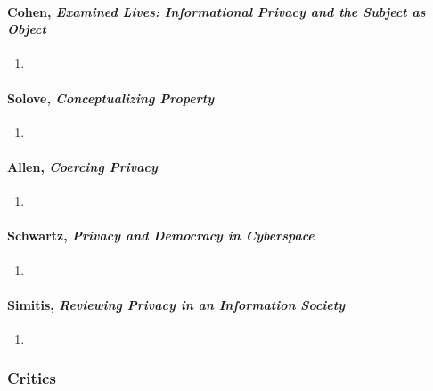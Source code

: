 \paragraph{Cohen, \emph{Examined Lives: Informational Privacy and the Subject 
as Object}}

\begin{enumerate}
    \item %
\end{enumerate}

\paragraph{Solove, \emph{Conceptualizing Property}}

\begin{enumerate}
    \item %
\end{enumerate}

\paragraph{Allen, \emph{Coercing Privacy}}

\begin{enumerate}
    \item %
\end{enumerate}

\paragraph{Schwartz, \emph{Privacy and Democracy in Cyberspace}}

\begin{enumerate}
    \item %
\end{enumerate}

\paragraph{Simitis, \emph{Reviewing Privacy in an Information Society}}

\begin{enumerate}
    \item %
\end{enumerate}

\subsubsection{Critics}

